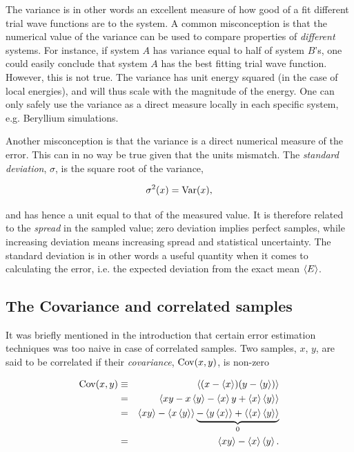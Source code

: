 The variance is in other words an excellent measure of how good of a fit different trial wave functions are to the system. A common misconception is that the numerical value of the variance can be used to compare properties of \textit{different} systems. For instance, if system $A$ has variance equal to half of system $B$'s, one could easily conclude that system $A$ has the best fitting trial wave function. However, this is not true. The variance has unit energy squared (in the case of local energies), and will thus scale with the magnitude of the energy. One can only safely use the variance as a direct measure locally in each specific system, e.g. Beryllium simulations.

Another misconception is that the variance is a direct numerical measure of the error. This can in no way be true given that the units mismatch. The \textit{standard deviation}, $\sigma$, is the square root of the variance,

\begin{equation}
\label{eq:stdNaive}
 \sigma^2(x) = \mathrm{Var}(x),
\end{equation}


and has hence a unit equal to that of the measured value. It is therefore related to the \textit{spread} in the sampled value; zero deviation implies perfect samples, while increasing deviation means increasing spread and statistical uncertainty. The standard deviation is in other words a useful quantity when it comes to calculating the error, i.e. the expected deviation from the exact mean $\left< E \right>$.

\subsection{The Covariance and correlated samples}

It was briefly mentioned in the introduction that certain error estimation techniques was too naive in case of correlated samples. Two samples, $x$, $y$, are said to be correlated if their \textit{covariance}, $\mathrm{Cov}(x, y)$, is non-zero

\begin{eqnarray}
\label{eq:covariance}
 \mathrm{Cov}(x, y) &\equiv& \left< (x - \left< x \right>)(y - \left< y \right>) \right> \nonumber\\
            &=& \left< xy - x\left< y \right> - \left< x \right>y + \left< x \right>\left< y \right> \right> \nonumber\\
            &=& \left< xy \right> - \left< x\left< y \right> \right> \underbrace{-\left< y\left< x \right> \right> + \left< \left< x \right>\left< y \right> \right>}_{0} \nonumber\\
            &=& \left< xy \right> - \left< x \right>\left< y \right>.
\end{eqnarray}

